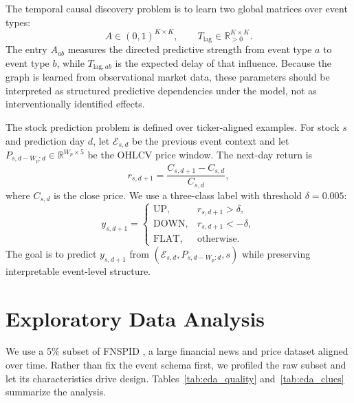 \documentclass[sigconf,review]{acmart}
\begin{document}
The temporal causal discovery problem is to learn two global matrices over event types:
\begin{equation}
A\in(0,1)^{K\times K}, \qquad T_{\mathrm{lag}}\in\mathbb{R}_{>0}^{K\times K}.
\end{equation}
The entry $A_{ab}$ measures the directed predictive strength from event type $a$ to event type $b$, while $T_{\mathrm{lag},ab}$ is the expected delay of that influence. Because the graph is learned from observational market data, these parameters should be interpreted as structured predictive dependencies under the model, not as interventionally identified effects.

The stock prediction problem is defined over ticker-aligned examples. For stock $s$ and prediction day $d$, let $\mathcal{E}_{s,d}$ be the previous event context and let $P_{s,d-W_p:d}\in\mathbb{R}^{W_p\times 5}$ be the OHLCV price window. The next-day return is
\begin{equation}
r_{s,d+1}=\frac{C_{s,d+1}-C_{s,d}}{C_{s,d}},
\end{equation}
where $C_{s,d}$ is the close price. We use a three-class label with threshold $\delta=0.005$:
\begin{equation}
y_{s,d+1}=
\begin{cases}
\mathrm{UP}, & r_{s,d+1}>\delta,\\
\mathrm{DOWN}, & r_{s,d+1}<-\delta,\\
\mathrm{FLAT}, & \mathrm{otherwise}.
\end{cases}
\end{equation}
The goal is to predict $y_{s,d+1}$ from $(\mathcal{E}_{s,d},P_{s,d-W_p:d},s)$ while preserving interpretable event-level structure.

\section{Exploratory Data Analysis}
\label{sec:eda}

We use a 5\% subset of FNSPID \cite{dong2024fnspid}, a large financial news and price dataset aligned over time. Rather than fix the event schema first, we profiled the raw subset and let its characteristics drive design. Tables~\ref{tab:eda_quality} and~\ref{tab:eda_clues} summarize the analysis.
\end{document}
